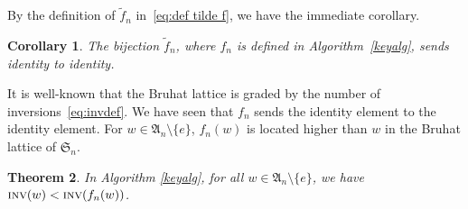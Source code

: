 \documentclass[12pt]{amsart}
\newtheorem{thm}{Theorem}[section]
\newtheorem{cor}[thm]{Corollary}
\theoremstyle{definition}
\numberwithin{equation}{section}
\newcommand{\sn}{\mathfrak{S}_n}
\newcommand{\inv}{\textsc{inv}}
\begin{document}
By the definition of $\tilde{f}_n$ in~\eqref{eq:def tilde f}, we have the immediate corollary.

\begin{cor}\label{c:identity to identity}
    The bijection $\tilde{f}_n$, where $f_n$ is defined in Algorithm~\ref{keyalg}, sends identity to identity.
\end{cor}

It is well-known that the Bruhat lattice is graded by the number of inversions~\eqref{eq:invdef}. We have seen that $f_n$ sends the identity element to the identity element. For $w \in\mathfrak A_n \setminus \{e\}$, $f_n(w)$ is located higher than $w$ in the Bruhat lattice of $\sn$.

\begin{thm}\label{t:invineq}
    In Algorithm \ref{keyalg}, for all $w\in \mathfrak A_n \setminus \{e\}$, we have $\inv (w) < \inv (f_n(w))$.
\end{thm}
\end{document}
